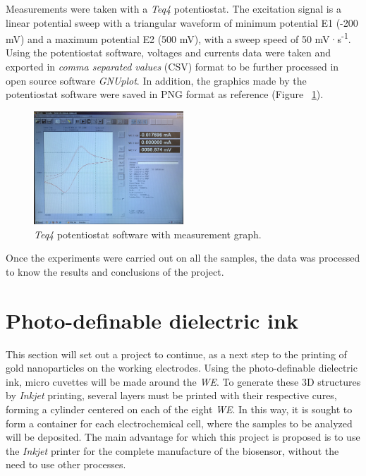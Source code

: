 Measurements were taken with a \textit{Teq4} potentiostat. The excitation signal is a linear potential sweep with a triangular waveform of minimum potential E1 (-200 mV) and a maximum potential E2 (500 mV), with a sweep speed of 50 mV·s\textsuperscript{-1}. Using the potentiostat software, voltages and currents data were taken and exported in \textit{comma separated values} (CSV) format to be further processed in open source software \textit{GNUplot}. In addition, the graphics made by the potentiostat software were saved in PNG format as reference (Figure ~\ref{fig:Figura_software_potenciostato}).

\begin{figure}[H]
  \centering
    \includegraphics[width=0.5\textwidth]{Figures/Figura_software_potenciostato}
  \caption{\textit{Teq4} potentiostat software with measurement graph.}
  \label{fig:Figura_software_potenciostato}
\end{figure}

Once the experiments were carried out on all the samples, the data was processed to know the results and conclusions of the project.

\section{Photo-definable dielectric ink}
\label{sec:tinta_dielec}
This section will set out a project to continue, as a next step to the printing of gold nanoparticles on the working electrodes. Using the photo-definable dielectric ink, micro cuvettes will be made around the \emph{WE}. To generate these 3D structures by \textit{Inkjet} printing, several layers must be printed with their respective cures, forming a cylinder centered on each of the eight \emph{WE}. In this way, it is sought to form a container for each electrochemical cell, where the samples to be analyzed will be deposited. The main advantage for which this project is proposed is to use the \textit{Inkjet} printer for the complete manufacture of the biosensor, without the need to use other processes.


